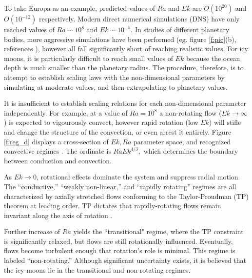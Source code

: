 \documentclass{article}
\def\lb{\left(}
\def\rb{\right)}
\begin{document}
To take Europa as an example, predicted values of $Ra$ and  $Ek$ are $O\lb 10^{20}\rb $ and $O\lb 10^{-12}\rb $ respectively. Modern direct numerical simulations (DNS) have only reached values of $Ra \sim 10^{8}$ and $Ek \sim 10^{-5}$\citep{dL23}. In studies of different planetary bodies, more aggressive simulations have been performed (eg. figure \ref{f:pic}(b), references \citep{cG19,tG16,tO25}), however all fall significantly short of reaching realistic values. For icy moons, it is particularly difficult to reach small values of $Ek$ because the ocean depth is much smaller than the planetary radius. The procedure, therefore, is to attempt to establish scaling laws with the non-dimensional parameters by simulating at moderate values, and then extrapolating to planetary values.

It is insufficient to establish scaling relations for each non-dimensional parameter independently. 
For example, at a value of $Ra = 10^{8}$ a non-rotating flow ($Ek\rightarrow \infty$) is expected to vigourously convect, however rapid rotation (low  $Ek$) will stifle and change the structure of the convection, or even arrest it entirely\citep{sC61}. 
Figure \ref{f:reg_d} displays a cross-section of $Ek,Ra$ parameter space, and recognized convective regimes \citep{tG16}. The ordinate is $RaEk^{4/3},$ which determines the boundary between conduction and convection\citep{sC61}.

As $Ek\rightarrow 0$, rotational effects dominate the system and suppress radial motion. The ``conductive,'' ``weakly non-linear,'' and ``rapidly rotating'' regimes\citep{tG16,kJ12} are all characterized by axially stretched flows conforming to the Taylor-Proudman (TP) theorem at leading order. TP dictates that rapidly-rotating flows remain invariant along the axis of rotation \citep{gB53}.

Further increase of $Ra$ yields the ``transitional" regime, where the TP constraint is significantly relaxed, but flows are still rotationally influenced.
Eventually, flows become turbulent enough that rotation's role is minimal. This regime is labeled ``non-rotating.''
Although significant uncertainty exists, it is believed that the icy-moons lie in the transitional and non-rotating regimes\citep{dL23,tG16}.
\end{document}
